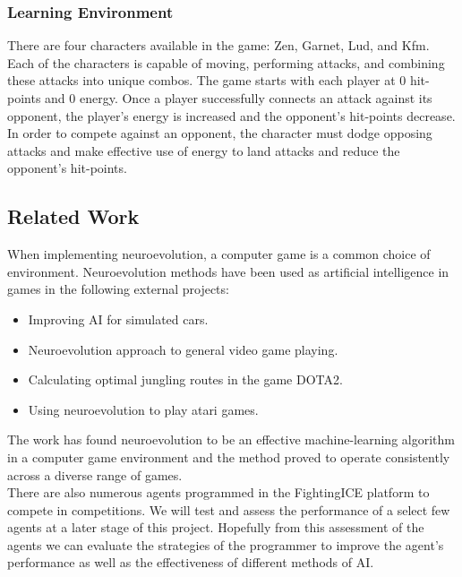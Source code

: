 \documentclass[12pt,a4paper]{article}
\begin{document}
\subsubsection{Learning Environment}
There are four characters available in the game: Zen, Garnet, Lud, and Kfm. Each of the characters is capable of moving, performing attacks, and combining these attacks into unique combos. The game starts with each player at 0 hit-points and 0 energy. Once a player successfully connects an attack against its opponent, the player's energy is increased and the opponent's hit-points decrease. In order to compete against an opponent, the character must dodge opposing attacks and make effective use of energy to land attacks and reduce the opponent's hit-points.\\
\begin{figure}[h]
\end{figure}
\newpage
\subsection{Related Work}
When implementing neuroevolution, a computer game is a common choice of environment. Neuroevolution methods have been used as artificial intelligence in games in the following external projects:
\begin{itemize}
\item Improving AI for simulated cars. \cite{pace}
\item Neuroevolution approach to general video game playing. \cite{genvid}
\item Calculating optimal jungling routes in the game DOTA2. \cite{dota}
\item Using neuroevolution to play atari games. \cite{atari}
\end{itemize} 
The work has found neuroevolution to be an effective machine-learning algorithm in a computer game environment and the method proved to operate consistently across a diverse range of games.\\

There are also numerous agents programmed in the FightingICE platform to compete in competitions. \cite{fightingice} We will test and assess the performance of a select few agents at a later stage of this project. Hopefully from this assessment of the agents we can evaluate the strategies of the programmer to improve the agent's performance as well as the effectiveness of different methods of AI.
\end{document}

